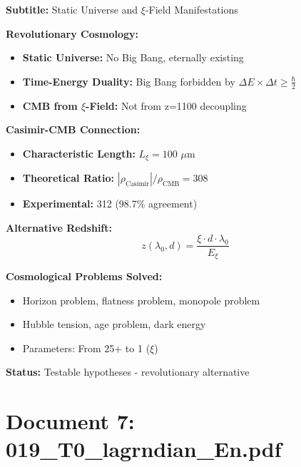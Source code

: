 	\begin{documentbox}
		\textbf{Subtitle:} Static Universe and $\xi$-Field Manifestations
		
		\textbf{Revolutionary Cosmology:}
		\begin{itemize}
			\item \textbf{Static Universe:} No Big Bang, eternally existing
			\item \textbf{Time-Energy Duality:} Big Bang forbidden by $\Delta E \times \Delta t \geq \frac{\hbar}{2}$
			\item \textbf{CMB from $\xi$-Field:} Not from z=1100 decoupling
		\end{itemize}
		
		\textbf{Casimir-CMB Connection:}
		\begin{itemize}
			\item \textbf{Characteristic Length:} $L_\xi = 100$ $\mu$m
			\item \textbf{Theoretical Ratio:} $|\rho_{\text{Casimir}}|/\rho_{\text{CMB}} = 308$
			\item \textbf{Experimental:} 312 (98.7\% agreement)
		\end{itemize}
		
		\textbf{Alternative Redshift:}
		\begin{equation}
			z(\lambda_0, d) = \frac{\xi \cdot d \cdot \lambda_0}{E_\xi}
		\end{equation}
		
		\textbf{Cosmological Problems Solved:}
		\begin{itemize}
			\item Horizon problem, flatness problem, monopole problem
			\item Hubble tension, age problem, dark energy
			\item Parameters: From 25+ to 1 ($\xi$)
		\end{itemize}
		
		\textbf{Status:} Testable hypotheses - revolutionary alternative
	\end{documentbox}
	
	\section{Document 7: 019\_T0\_lagrndian\_En.pdf}
	

